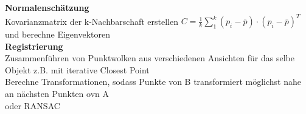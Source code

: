 \textbf{Normalenschätzung}\\
Kovarianzmatrix der k-Nachbarschaft erstellen \(C = \frac{1}{k} \sum_1^k (p_i - \bar{p}) \cdot (p_i - \bar{p})^T\)
und berechne Eigenvektoren\\

\textbf{Registrierung}\\
Zusammenführen von Punktwolken aus verschiedenen Ansichten für das selbe Objekt
z.B. mit iterative Closest Point\\
Berechne Transformationen, sodass Punkte von B transformiert möglichst nahe an nächsten Punkten ovn A \\

oder RANSAC

